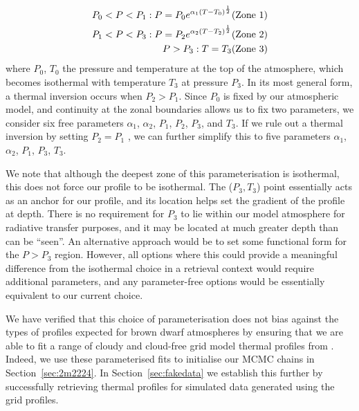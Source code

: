 \documentclass[useAMS,usenatbib]{mn2e}
\begin{document}
\begin{equation}
\begin{aligned}
P_{0} < P < P_{1}: P  = P_{0} e^{\alpha_{1}(T - T_{0})^{\frac{1}{2}}}   \hfill (\text{Zone 1})\\
P_{1} < P < P_{3}: P  = P_{2} e^{\alpha_{2}(T - T_{2})^{\frac{1}{2}}}   \hfill (\text{Zone 2})\\
P > P_{3} : T = T_{3}  \hfill (\text{Zone 3})
\end{aligned}
\label{eqn:madhu}
\end{equation}
where $P_{0}$, $T_{0}$ the pressure and temperature at the top of the atmosphere, which becomes isothermal with temperature $T_{3}$ at pressure $P_{3}$.
In its most general form, a thermal inversion occurs when $P_{2} > P_{1}$. Since $P_{0}$ is fixed by our atmospheric model, and continuity at the zonal boundaries allows us to fix two parameters, we consider six free parameters $\alpha_{1}$, $\alpha_{2}$, $P_1$, $P_2$, $P_3$, and $T_3$.  If we rule out a thermal inversion by setting $P_{2} = P_{1}$ \citep[see Figure 1, ][]{madhu2009},  we can further simplify this to five parameters $\alpha_{1}$, $\alpha_{2}$, $P_1$, $P_3$, $T_3$.  

We note that although the deepest zone of this parameterisation is isothermal, this does not force our profile to be isothermal. The ($P_{3}, T_{3}$) point essentially acts as an anchor for our profile, and its location helps set the gradient of the profile at depth. There is no requirement for $P_{3}$ to lie within our model atmosphere for radiative transfer purposes, and it may be located at much greater depth than can be ``seen''.  An alternative approach would be to set some functional form for the $P > P_{3}$ region.  However, all options where this could provide a meaningful difference from the isothermal choice in a retrieval context would require additional parameters, and any parameter-free options would be essentially equivalent to our current choice. 

We have verified that this choice of parameterisation does not bias against the types of profiles expected for brown dwarf atmospheres by ensuring that we are able to fit a range of cloudy and cloud-free grid model thermal profiles from \citet{sm08}. Indeed, we use these parameterised fits to initialise our MCMC chains in Section~\ref{sec:2m2224}. In Section~\ref{sec:fakedata} we establish this further by successfully retrieving thermal profiles for simulated data generated using the \citet{sm08} grid profiles.
\end{document}
